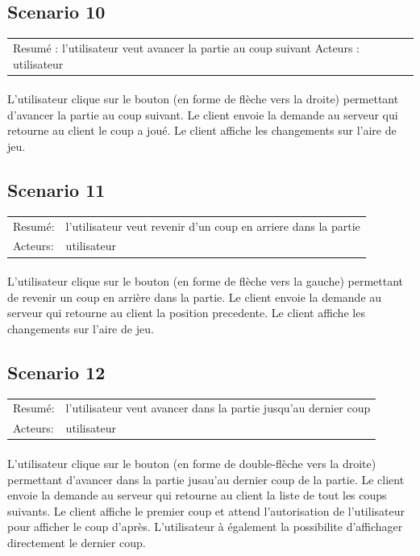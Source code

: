 \documentclass[french,12pt]{report}
\begin{document}
\subsection*{Scenario 10}

\begin{tabular}{ll}
  Resum\'e : l'utilisateur veut avancer la partie au coup suivant
  Acteurs : utilisateur
\end{tabular}

\paragraph{}
  L'utilisateur clique sur le bouton (en forme de fl\`eche vers la droite) 
permettant d'avancer la partie au coup suivant.
  Le client envoie la demande au serveur qui retourne au client le coup a 
jou\'e. Le client affiche les changements sur l'aire de jeu.



\subsection*{Scenario 11}

\begin{tabular}{ll}
  Resum\'e: & l'utilisateur veut revenir d'un coup en arriere dans la partie \\
  Acteurs: & utilisateur
\end{tabular}

\paragraph{}
  L'utilisateur clique sur le bouton (en forme de fl\`eche vers la gauche) 
permettant de revenir un coup en arri\`ere dans la partie.
  Le client envoie la demande au serveur qui retourne au client la 
position precedente.
  Le client affiche les changements sur l'aire de jeu.



\subsection*{Scenario 12}

\begin{tabular}{ll}
  Resum\'e: & l'utilisateur veut avancer dans la partie jusqu'au dernier 
coup \\
  Acteurs: & utilisateur
\end{tabular}

\paragraph{}
  L'utilisateur clique sur le bouton (en forme de double-fl\`eche vers la 
droite) permettant d'avancer dans la partie jusau'au dernier coup de la partie.
  Le client envoie la demande au serveur qui retourne au client la 
liste de tout les coups suivants.
  Le client affiche le premier coup et attend l'autorisation de 
l'utilisateur pour afficher le coup d'apr\`es.
  L'utilisateur \`a \'egalement la possibilite d'affichager directement 
le dernier coup.
\end{document}
